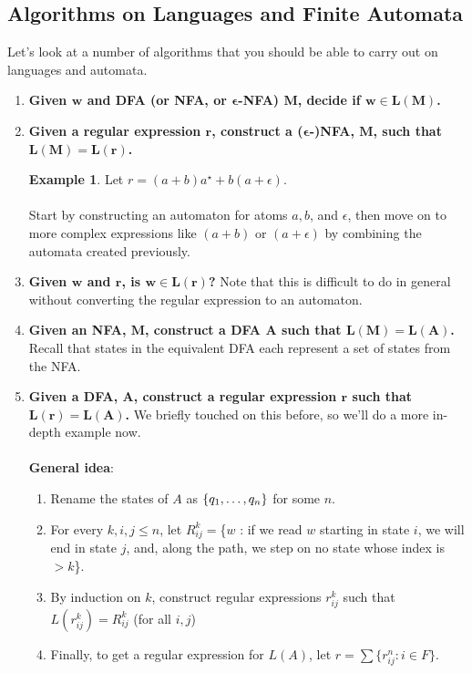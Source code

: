 \documentclass[]{article}
\DeclarePairedDelimiter{\set}{\lbrace}{\rbrace}
\theoremstyle{definition}
\newtheorem{ex}{Example}[section]
\newcommand{\lecture}[1]{\marginpar{{\footnotesize $\leftarrow$ \underline{#1}}}}
\begin{document}
      \subsection{Algorithms on Languages and Finite Automata} \lecture{October 10, 2013}
        Let's look at a number of algorithms that you should be able to carry out on languages and automata.

        \begin{enumerate}
          \item \textbf{Given $\boldsymbol{w}$ and DFA (or NFA, or $\boldsymbol{\epsilon}$-NFA) $\boldsymbol{M}$, decide if $\boldsymbol{w \in L(M)}$.}
          \item \textbf{Given a regular expression $\boldsymbol{r}$, construct a ($\boldsymbol{\epsilon}$-)NFA, $\boldsymbol{M}$, such that $\boldsymbol{L(M) = L(r)}$.}
          \begin{ex}
            Let $r = (a + b) a^\star + b(a + \epsilon)$.
            \\ \\
            Start by constructing an automaton for atoms $a, b$, and $\epsilon$, then move on to more complex expressions like $(a + b)$ or $(a + \epsilon)$ by combining the automata created previously.
          \end{ex}

          \item \textbf{Given $\boldsymbol{w}$ and $\boldsymbol{r}$, is $\boldsymbol{w \in L(r)}$?} Note that this is difficult to do in general without converting the regular expression to an automaton.

          \item \textbf{Given an NFA, $\boldsymbol{M}$, construct a DFA $\boldsymbol{A}$ such that $\boldsymbol{L(M) = L(A)}$.} Recall that states in the equivalent DFA each represent a set of states from the NFA.

          \item \textbf{Given a DFA, $\boldsymbol{A}$, construct a regular expression $\boldsymbol{r}$ such that $\boldsymbol{L(r) = L(A)}$.} We briefly touched on this before, so we'll do a more in-depth example now.
          \\ \\
          \textbf{General idea}:
          \begin{enumerate}
            \item Rename the states of $A$ as $\set{ q_1, \ldots, q_n }$ for some $n$.
            \item For every $k, i, j \le n$, let $R_{ij}^k = $\{$w$ : if we read $w$ starting in state $i$, we will end in state $j$, and, along the path, we step on no state whose index is $> k$\}.
            \item By induction on $k$, construct regular expressions $r_{ij}^k$ such that $L(r_{ij}^k) = R_{ij}^k$ (for all $i, j$)
            \item Finally, to get a regular expression for $L(A)$, let $r = \sum \{ r_{ij}^n : i \in F \}$.
          \end{enumerate}


\end{enumerate}
\end{document}
